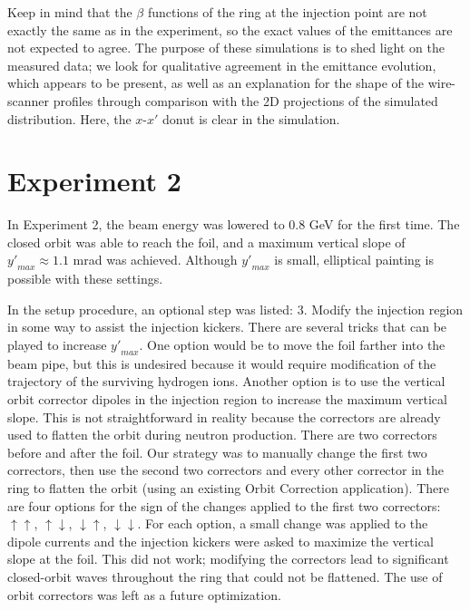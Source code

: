 %
Keep in mind that the $\beta$ functions of the ring at the injection point are not exactly the same as in the experiment, so the exact values of the emittances are not expected to agree. The purpose of these simulations is to shed light on the measured data; we look for qualitative agreement in the emittance evolution, which appears to be present, as well as an explanation for the shape of the wire-scanner profiles through comparison with the 2D projections of the simulated distribution. Here, the $x$-$x'$ donut is clear in the simulation.


\section{Experiment 2}

In Experiment 2, the beam energy was lowered to 0.8 GeV for the first time. The closed orbit was able to reach the foil, and a maximum vertical slope of ${y'}_{max} \approx 1.1$ mrad was achieved. Although ${y'}_{max}$ is small, elliptical painting is possible with these settings. 

In the setup procedure, an optional step was listed: 3. Modify the injection region in some way to assist the injection kickers. There are several tricks that can be played to increase ${y'}_{max}$. One option would be to move the foil farther into the beam pipe, but this is undesired because it would require modification of the trajectory of the surviving hydrogen ions. Another option is to use the vertical orbit corrector dipoles in the injection region to increase the maximum vertical slope. This is not straightforward in reality because the correctors are already used to flatten the orbit during neutron production. There are two correctors before and after the foil. Our strategy was to manually change the first two correctors, then use the second two correctors and every other corrector in the ring to flatten the orbit (using an existing Orbit Correction application). There are four options for the sign of the changes applied to the first two correctors: $\uparrow\uparrow$, $\uparrow\downarrow$, $\downarrow\uparrow$, $\downarrow\downarrow$. For each option, a small change was applied to the dipole currents and the injection kickers were asked to maximize the vertical slope at the foil. This did not work; modifying the correctors lead to significant closed-orbit waves throughout the ring that could not be flattened. The use of orbit correctors was left as a future optimization. 

